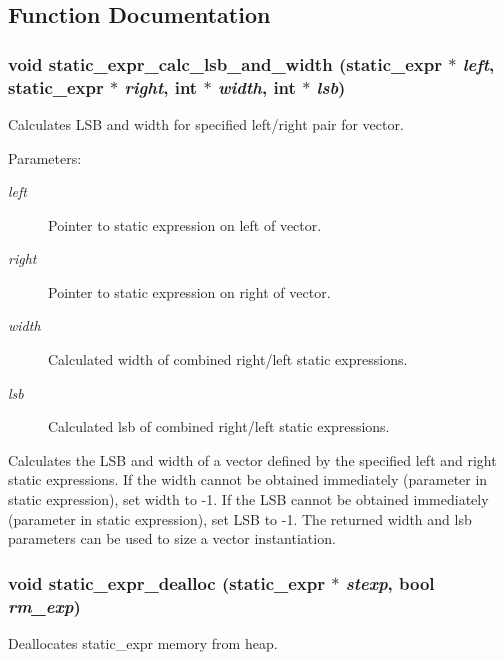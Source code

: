 \subsection{Function Documentation}
\subsubsection{\setlength{\rightskip}{0pt plus 5cm}void static\_\-expr\_\-calc\_\-lsb\_\-and\_\-width ({\bf static\_\-expr} $\ast$ {\em left}, {\bf static\_\-expr} $\ast$ {\em right}, int $\ast$ {\em width}, int $\ast$ {\em lsb})}\label{static_8c_a2}


Calculates LSB and width for specified left/right pair for vector.

\begin{Desc}
\item[Parameters:]
\begin{description}
\item[{\em left}]Pointer to static expression on left of vector. \item[{\em right}]Pointer to static expression on right of vector. \item[{\em width}]Calculated width of combined right/left static expressions. \item[{\em lsb}]Calculated lsb of combined right/left static expressions.\end{description}
\end{Desc}
Calculates the LSB and width of a vector defined by the specified left and right static expressions. If the width cannot be obtained immediately (parameter in static expression), set width to -1. If the LSB cannot be obtained immediately (parameter in static expression), set LSB to -1. The returned width and lsb parameters can be used to size a vector instantiation. 
\subsubsection{\setlength{\rightskip}{0pt plus 5cm}void static\_\-expr\_\-dealloc ({\bf static\_\-expr} $\ast$ {\em stexp}, {\bf bool} {\em rm\_\-exp})}\label{static_8c_a3}


Deallocates static\_\-expr memory from heap.

